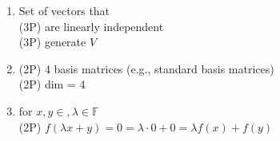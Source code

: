 {\color{solution}
\begin{enumerate}
	\item Set of vectors that\\
	\textcolor{exampoints}{(3P)} are linearly independent\\
	 \textcolor{exampoints}{(3P)} generate $V$
	\item  \textcolor{exampoints}{(2P)} 4 basis matrices (e.g., standard basis matrices)\\
	\textcolor{exampoints}{(2P)} dim = 4
	\item for $x,y\in,\lambda\in\mathbb{F}$ \\
	\textcolor{exampoints}{(2P)} $  f(\lambda x + y) = 0 = \lambda \cdot 0 + 0 = \lambda f( x) + f(y)$
\end{enumerate}
}
